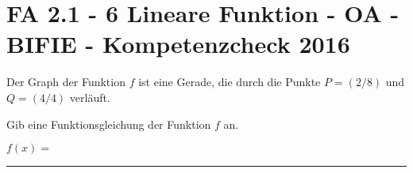 \section{FA 2.1 - 6 Lineare Funktion - OA - BIFIE - Kompetenzcheck 2016}

\begin{beispiel}[FA 2.1]{1} %
				Der Graph der Funktion $f$ ist eine Gerade, die durch die Punkte $P=(2/8)$ und $Q=(4/4)$ verläuft.

Gib eine Funktionsgleichung der Funktion $f$ an.

$f(x)=$\rule{5cm}{0.3pt}

\end{beispiel}	